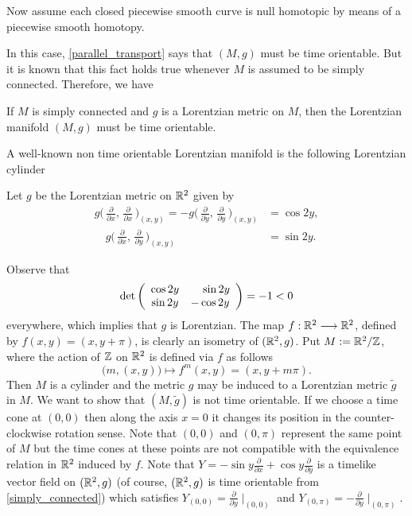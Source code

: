 Now assume each closed piecewise smooth curve is null homotopic by means of a piecewise smooth homotopy.

In this case, \autoref{parallel_transport} says that $(M,g)$ must be time orientable. But it is known that this fact holds true whenever $M$ is assumed to be simply connected. Therefore, we have

\begin{corollary}\label{simply_connected}
    If $M$ is simply connected and $g$ is a Lorentzian metric on $M$, then the Lorentzian manifold $(M,g)$ must be time orientable.
\end{corollary}

A well-known non time orientable Lorentzian manifold is the following Lorentzian cylinder \cite[Example 1.2.3]{sachs77}

\begin{example}
    Let $g$ be the Lorentzian metric on $\mathbb{R}^2$ given by
    \begin{align*}
        g\Big(\,\frac{\partial}{\partial x},\,\frac{\partial}{\partial x}\,\Big)_{(x,y)}=-g\Big(\,\frac{\partial}{\partial y},\,\frac{\partial}{\partial y}\,\Big)_{(x,y)} &= \cos 2y,\\
        \quad g\Big(\,\frac{\partial}{\partial x},\,\frac{\partial}{\partial y}\,\Big)_{(x,y)}&= \sin 2y.
    \end{align*}

    Observe that
    \[
        \mathrm{det}\left(
        \begin{array}{cc}
            \cos 2y & \hspace*{4mm}\sin 2y  \\
            \sin 2y & -\cos 2y
        \end{array} \right) = -1 < 0
    \]
    everywhere, which implies that $g$ is Lorentzian. The map $f : \mathbb{R}^2 \longrightarrow \mathbb{R}^2$, defined by $f(x,y)=(x,y+\pi)$, is clearly an isometry of $(\mathbb{R}^2,g)$. Put $M:=\mathbb{R}^2 / {\mathbb Z}$, where the action of ${\mathbb Z}$ on $\mathbb{R}^2$ is defined via $f$ as follows
    \[
	    \big(m,(x,y)\big) \mapsto f^m(x,y)=(x,y+m\pi).
	\]
    Then $M$ is a cylinder and the metric $g$ may be induced to a Lorentzian metric ${\tilde g}$ in $M$. We want to show that $(M,{\tilde g})$ is not time orientable. If we choose a time cone at $(0,0)$ then along the axis $x=0$ it changes its position in the counter-clockwise rotation sense. Note that $(0,0)$ and $(0,\pi)$ represent the same point of $M$ but the time cones at these points are not compatible with the equivalence relation in $\mathbb{R}^2$ induced by $f$. Note that $Y=-\sin y \frac{\partial}{\partial x} + \cos y \frac{\partial}{\partial y}$ is a timelike vector field on $(\mathbb{R}^2,g)$ (of course, $(\mathbb{R}^2,g)$ is time orientable from \autoref{simply_connected}) which satisfies $Y_{(0,0)}=\frac{\partial}{\partial y}\mid_{(0,0)}$ and $Y_{(0,\pi)}=-\frac{\partial}{\partial y}\mid_{(0,\pi)}$.


\end{example}
